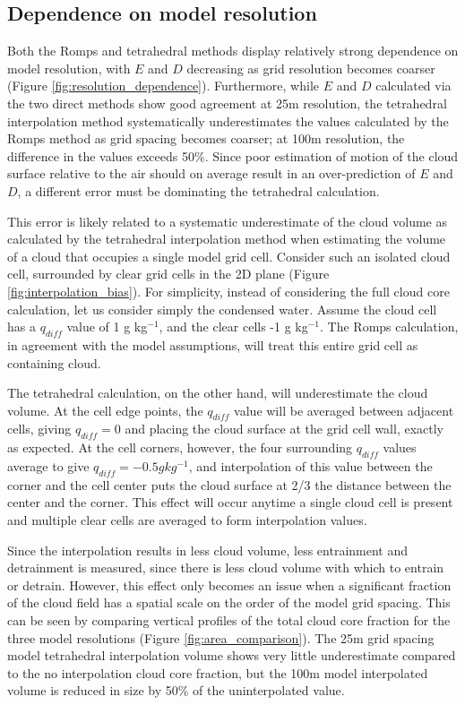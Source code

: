\documentclass[12pt]{article}
\begin{document}
\subsection{Dependence on model resolution}

Both the Romps and tetrahedral methods display relatively strong dependence 
on model resolution, with $E$ and $D$ decreasing as grid resolution becomes 
coarser (Figure \ref{fig:resolution_dependence}).  Furthermore, while $E$ 
and $D$ calculated via the two direct methods show good agreement at 25m 
resolution, the tetrahedral interpolation method systematically 
underestimates the values calculated by the Romps method as grid spacing 
becomes coarser; at 100m resolution, the difference in the values exceeds 
50\%.  Since poor estimation of motion of the cloud surface relative to the 
air should on average result in an over-prediction of $E$ and $D$, a 
different error must be dominating the tetrahedral calculation.

This error is likely related to a systematic underestimate of the cloud volume 
as calculated by the tetrahedral interpolation method when estimating the 
volume of a cloud that occupies a single model grid cell.  Consider such an 
isolated cloud cell, surrounded by clear grid cells in the 2D plane (Figure 
\ref{fig:interpolation_bias}).  For simplicity, instead of considering the 
full cloud core calculation, let us consider simply the condensed water.
Assume the cloud cell has a $q_{diff}$ value of 1 g kg$^{-1}$, and the clear 
cells -1 g kg$^{-1}$.  The Romps calculation, in agreement with the model 
assumptions, will treat this entire grid cell as containing cloud.

The tetrahedral calculation, on the other hand, will underestimate the cloud 
volume.  At the cell edge points, the $q_{diff}$ value will be averaged between
adjacent cells, giving $q_{diff} = 0$ and placing the cloud surface at the grid 
cell wall, exactly as expected.  At the cell corners, however, the four 
surrounding $q_{diff}$ values average to give $q_{diff} = -0.5 g kg^{-1}$, and 
interpolation of this value between the corner and the cell center puts the 
cloud surface at 2/3 the distance between the center and the corner.  This 
effect will occur anytime a single cloud cell is present and multiple clear 
cells are averaged to form interpolation values.

Since the interpolation results in less cloud volume, less entrainment and 
detrainment is measured, since there is less cloud volume with which to 
entrain or detrain.  However, this effect only becomes an issue when a 
significant fraction of the cloud field has a spatial scale on the order of 
the model grid spacing.  This can be seen by comparing vertical profiles of 
the total cloud core fraction for the three model resolutions (Figure 
\ref{fig:area_comparison}).  The 25m grid spacing model tetrahedral 
interpolation volume shows very little underestimate compared to the no 
interpolation cloud core fraction, but the 100m model interpolated volume is 
reduced in size by 50\% of the uninterpolated value.
\end{document}
